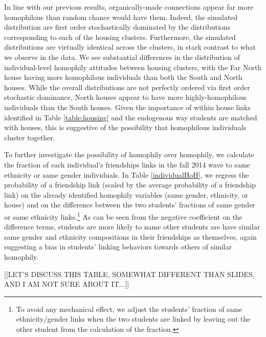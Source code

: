 \documentclass[12pt,letterpaper,english]{article}
\begin{document}
In line with our previous results, organically-made connections appear far more homophilous than random chance would have them. Indeed, the simulated distribution are first order stochastically dominated by the distributions corresponding to each of the housing clusters. Furthermore, the simulated distributions are virtually identical across the clusters, in stark contrast to what we observe in the data. We see substantial differences in the distribution of individual-level homophily attitudes between housing clusters, with the Far North house having more homophilous individuals than both the South and North houses. While the overall distributions are not perfectly ordered via first order stochastic dominance, North houses appear to have more highly-homophilous individuals than the South houses. Given the importance of within house links identified in Table \ref{table:housing} and the endogenous way students are matched with houses, this is suggestive of the possibility that homophilous individuals cluster together. 

To further investigate the possibility of homophily over homophily, we calculate the fraction of each individual's friendships links in the fall 2014 wave to same ethnicity or same gender individuals. In Table \ref{individualHoH}, we regress the probability of a friendship link (scaled by the average probability of a friendship link) on the already identified homophily variables (same gender, ethnicity, or house) and on the difference between the two students' fractions of same gender or same ethnicity links.\footnote{To avoid any mechanical effect, we adjust the students' fraction of same ethnicity/gender links when the two students are linked by leaving out the other student from the calculation of the fraction.} %
As can be seen from the negative coefficient on the difference terms, students are more likely to name other students are have similar same gender and ethnicity compositions in their friendships as themselves, again suggesting a bias in students' linking behaviors towards others of similar homophily.



[[LET'S DISCUSS THIS TABLE, SOMEWHAT DIFFERENT THAN SLIDES, AND I AM NOT SURE ABOUT IT...]]




\end{document}
